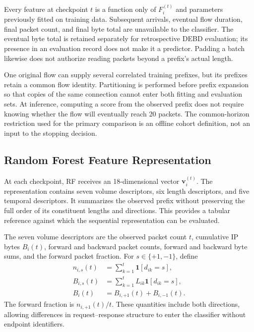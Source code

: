 \documentclass[conference]{IEEEtran}
\begin{document}
Every feature at checkpoint $t$ is a function only of $F_i^{(t)}$ and parameters previously fitted on training data. Subsequent arrivals, eventual flow duration, final packet count, and final byte total are unavailable to the classifier. The eventual byte total is retained separately for retrospective DEBD evaluation; its presence in an evaluation record does not make it a predictor. Padding a batch likewise does not authorize reading packets beyond a prefix's actual length.

One original flow can supply several correlated training prefixes, but its prefixes retain a common flow identity. Partitioning is performed before prefix expansion so that copies of the same connection cannot enter both fitting and evaluation sets. At inference, computing a score from the observed prefix does not require knowing whether the flow will eventually reach 20 packets. The common-horizon restriction used for the primary comparison is an offline cohort definition, not an input to the stopping decision.

\subsection{Random Forest Feature Representation}
At each checkpoint, RF receives an 18-dimensional vector $\mathbf{v}_i^{(t)}$. The representation contains seven volume descriptors, six length descriptors, and five temporal descriptors. It summarizes the observed prefix without preserving the full order of its constituent lengths and directions. This provides a tabular reference against which the sequential representation can be evaluated.

The seven volume descriptors are the observed packet count $t$, cumulative IP bytes $B_i(t)$, forward and backward packet counts, forward and backward byte sums, and the forward packet fraction. For $s\in\{+1,-1\}$, define
\begin{equation}
\begin{aligned}
n_{i,s}(t)&=\sum_{k=1}^{t}\mathbf{1}[d_{ik}=s],\\
B_{i,s}(t)&=\sum_{k=1}^{t}L_{ik}\mathbf{1}[d_{ik}=s],\\
B_i(t)&=B_{i,+1}(t)+B_{i,-1}(t).
\end{aligned}
\label{eq:prefix_volume}
\end{equation}
The forward fraction is $n_{i,+1}(t)/t$. These quantities include both directions, allowing differences in request--response structure to enter the classifier without endpoint identifiers.
\end{document}
